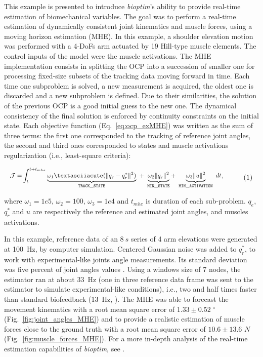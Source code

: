 This example is presented to introduce \textit{bioptim}'s ability to provide real-time estimation of biomechanical variables.
The goal was to perform a real-time estimation of dynamically consistent joint kinematics and muscle forces, using a moving horizon estimation (MHE). 
In this example, a shoulder elevation motion was performed with a 4-DoFs arm actuated by 19 Hill-type muscle elements.
The control inputs of the model were the muscle activations.
The MHE implementation consists in splitting the OCP into a succession of smaller one for processing fixed-size subsets of the tracking data moving forward in time. 
Each time one subproblem is solved, a new measurement is acquired, the oldest one is discarded and a new subproblem is defined. 
Due to their similarities, the solution of the previous OCP is a good initial guess to the new one. 
The dynamical consistency of the final solution is enforced by continuity constraints on the initial state. 
Each objective function (Eq.~\ref{eq:ocp_exMHE}) was written as the sum of three terms: the first one corresponded to the tracking of reference joint angles, the second and third ones corresponded to states and muscle activations regularization (i.e., least-square criteria): 

\[ 
\resizebox{0.9\columnwidth}{!}{$ 
\begin{aligned}
\mathcal{J} = &\int_t^{t+t_{mhe}}\underbrace{\omega_1´(\|q_{e} - q^*_{r}\|^{2})}_{\mathtt{TRACK\_STATE}}~ 
+ ~ \underbrace{\omega_2\|q_{e}\|^2}_{\mathtt{MIN\_STATE}} 
+ ~ \underbrace{\omega_3\|u\|^2}_{\mathtt{MIN\_ACTIVATION}}~dt, 
\end{aligned}  
$}  
\addtag  
\label{eq:ocp_exMHE}  
\]  

\noindent where $\omega_1 =1e5$, $\omega_2 = 100$, $\omega_3 = 1e4$ and $t_{mhe}$ is duration of each sub-problem. $q_{e}$, $q^*_{r}$  and $u$ are respectively the reference and estimated joint angles, and muscles activations. 

In this example, reference data of an $8~s$ series of 4 arm elevations were generated at 100~Hz, by computer simulation.
Centered Gaussian noise was added to $q^*_{r}$, to work with experimental-like joints angle measurements.
Its standard deviation was five percent of joint angles values \cite{REFestimationerror}.
Using a windows size of 7 nodes, the estimator ran at about 33~Hz (one in three reference data frame was sent to the estimator to simulate experimental-like conditions), i.e., two and half times faster than standard biofeedback (13~Hz, \cite{kannape2013biofeedback}).
The MHE was able to forecast the movement kinematics with a root mean square error of $1.33\pm0.52\text{~}^{\circ}$ (Fig.~\ref{fig:joint_angles_MHE}) and to provide a realistic estimation of muscle forces close to the ground truth with a root mean square error of $10.6\pm13.6\text{~}N$ (Fig.~\ref{fig:muscle_forces_MHE}). 
For a more in-depth analysis of the real-time estimation capabilities of \textit{bioptim}, see \cite{bailly2020real}.
 

